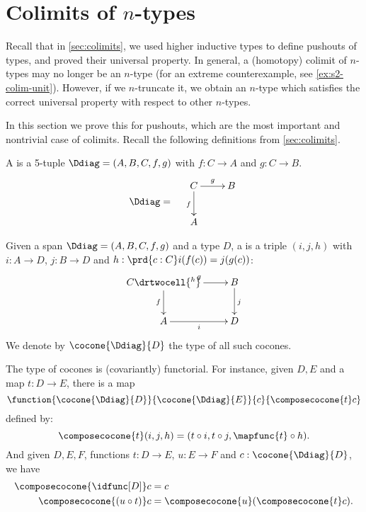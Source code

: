 \section{Colimits of \texorpdfstring{$n$}{n}-types}
\label{sec:pushouts}

Recall that in \cref{sec:colimits}, we used higher inductive types to define pushouts of types, and proved their universal property.
In general, a (homotopy) colimit of $n$-types may no longer be an $n$-type (for an extreme counterexample, see \cref{ex:s2-colim-unit}).
However, if we $n$-truncate it, we obtain an $n$-type which satisfies the correct universal property with respect to other $n$-types.

In this section we prove this for pushouts, which are the most important and nontrivial case of colimits.
Recall the following definitions from \cref{sec:colimits}.

\begin{defn}
  A  %
  is a 5-tuple $\Ddiag=(A,B,C,f,g)$ with %
  $f:C\to{}A$ and $g:C\to{}B$.
  \[\Ddiag=\quad\vcenter{\xymatrix{C \ar^g[r] \ar_f[d] & B \\ A & }}\]
\end{defn}

\begin{defn}
  Given a span $\Ddiag=(A,B,C,f,g)$ and a type $D$, a %
   is a triple $(i, j, h)$
  with $i:A\to{}D$, $j:B\to{}D$ and $h : \prd{c:C}i(f(c))=j(g(c))$:
  \[\uppercurveobject{{ }}\lowercurveobject{{ }}\twocellhead{{ }}
  \xymatrix{C \ar^g[r] \ar_f[d] \drtwocell{^h} & B \ar^j[d] \\ A \ar_i[r] & D
  }\]
  We denote by $\cocone{\Ddiag}{D}$ the type of all such cocones.
\end{defn}

The type of cocones is (covariantly) functorial.
For instance, given $D,E$ %
and a map $t:D\to{}E$, there is a map
  \[\function{\cocone{\Ddiag}{D}}{\cocone{\Ddiag}{E}}{c}{\composecocone{t}c}\]
  defined by:
  \[\composecocone{t}(i,j,h)=(t\circ{}i,t\circ{}j,\mapfunc{t}\circ{}h).\]
And given $D,E,F$, %
functions $t:D\to{}E$, $u:E\to{}F$ and $c:\cocone{\Ddiag}{D}$, we have
\begin{align}
  \composecocone{\idfunc[D]}c &= c \label{eq:composeconeid}\\
  \composecocone{(u\circ{}t)}c&=\composecocone{u}(\composecocone{t}c). \label{eq:composeconefunc}
\end{align}

